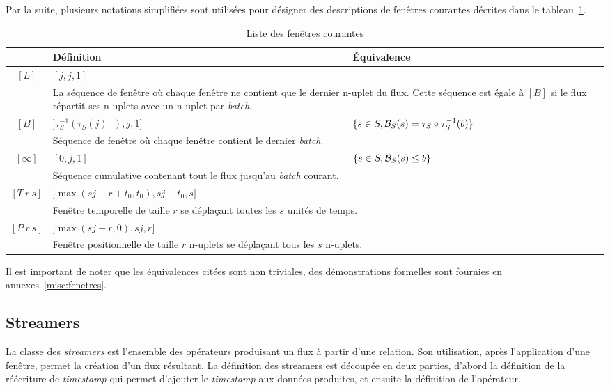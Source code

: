 Par la suite, plusieurs notations simplifiées sont utilisées pour désigner des descriptions de fenêtres courantes décrites dans le tableau~\ref{tab:windows}.
\begin{table}[ht]
\centering
\begin{tabular}{c||p{}|p{}}
  & Définition & Équivalence \\ \bottomrule
 $[L]$ & $[j,j,1]$ &  \\ 
 & \multicolumn{2}{p{0.8\textwidth}}{La séquence de fenêtre où chaque fenêtre ne contient que le dernier n-uplet du flux. Cette séquence est égale à $[B]$ si le flux répartit ses n-uplets avec un n-uplet par \textit{batch}.} \\ \hline
 $[B]$ & $]\tau_S^{-1}(\tau_S(j)^-),j,1]$ & $\{s\in S, \mathcal{B}_S(s) = \tau_S\circ\tau_S^{-1}(b)\}$ \\ 
 & \multicolumn{2}{p{0.8\textwidth}}{Séquence de fenêtre où chaque fenêtre contient le dernier \textit{batch}.} \\\hline
 $[\infty]$ & $[0,j,1]$ & $\{s\in S, \mathcal{B}_S(s) \leq b\}$ \\
 & \multicolumn{2}{p{0.8\textwidth}}{Séquence cumulative contenant tout le flux jusqu'au \textit{batch} courant.} \\\hline
 $[T\ r\ s]$ & $]\max(sj-r+t_0,t_0),sj+t_0,s]$ &  \\
 & \multicolumn{2}{p{0.8\textwidth}}{Fenêtre temporelle de taille $r$ se déplaçant toutes les $s$ unités de temps.} \\\hline
 $[P\ r\ s]$ & $]\max(sj-r,0),sj,r]$ &  \\
 & \multicolumn{2}{p{0.8\textwidth}}{Fenêtre positionnelle de taille $r$ n-uplets se déplaçant tous les $s$ n-uplets.} \\
 \toprule
\end{tabular}
\caption{Liste des fenêtres courantes} \label{tab:windows}
\end{table}
Il est important de noter que les équivalences citées sont non triviales, des démonstrations formelles sont fournies en annexes~\ref{misc:fenetres}.

\subsection{Streamers}
La classe des \textit{streamers} est l'ensemble des opérateurs produisant un flux à partir d'une relation. Son utilisation, après l'application d'une fenêtre, permet la création d'un flux résultant. La définition des streamers est découpée en deux parties, d'abord la définition de la réécriture de \textit{timestamp} qui permet d'ajouter le \textit{timestamp} aux données produites, et ensuite la définition de l'opérateur.
